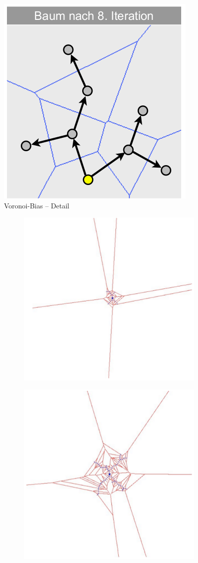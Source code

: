 \begin{figure}[h!]
	\centering
	\includegraphics[width=.15\textwidth]{figures/ch04_voronoi.png}
	\caption{Voronoi-Bias -- Detail}
	\label{fig:vb}
\end{figure}
\begin{figure}[h!]
	\centering
	\begin{subfigure}{.3\textwidth}
		\includegraphics[width=\textwidth]{figures/ch04_voron1.png}
	\end{subfigure}
	\begin{subfigure}{.3\textwidth}
		\includegraphics[width=\textwidth]{figures/ch04_voron2.png}

\end{subfigure}
\end{figure}
